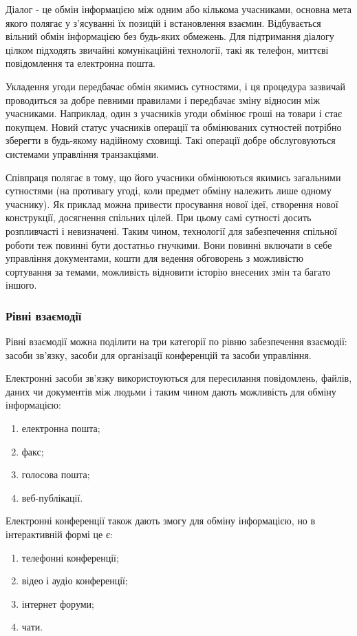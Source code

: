 \par Діалог - це обмін інформацією між одним або кількома учасниками, основна мета якого полягає у з'ясуванні їх позицій і встановлення взаємин. 
Відбувається вільний обмін інформацією без будь-яких обмежень. 
Для підтримання діалогу цілком підходять звичайні комунікаційні технології, такі як телефон, миттєві повідомлення та електронна пошта.
\par Укладення угоди передбачає обмін якимись сутностями, і ця процедура зазвичай проводиться за добре певними правилами і передбачає зміну відносин між учасниками. Наприклад, один з учасників угоди обмінює гроші на товари і стає покупцем. Новий статус учасників операції та обмінюваних сутностей потрібно зберегти в будь-якому надійному сховищі. Такі операції добре обслуговуються системами управління транзакціями. 
\par Співпраця полягає в тому, що його учасники обмінюються якимись загальними сутностями (на противагу угоді, коли предмет обміну належить лише одному учаснику). 
Як приклад можна привести просування нової ідеї, створення нової конструкції, досягнення спільних цілей. 
При цьому самі сутності досить розпливчасті і невизначені. 
Таким чином, технології для забезпечення спільної роботи теж повинні бути достатньо гнучкими. 
Вони повинні включати в себе управління документами, кошти для ведення обговорень з можливістю сортування за темами, можливість відновити історію внесених змін та багато іншого.
 
\subsubsection{Рівні взаємодії}

Рівні взаємодії можна поділити на три категорії по рівню забезпечення взаємодії: засоби зв'язку, засоби для організації конференцій та засоби управління.

\par Електронні засоби зв'язку використоуються для пересилання повідомлень, файлів, даних чи документів між людьми і таким чином дають можливість для обміну інформацією:
\begin{enumerate}
\item електронна пошта;
\item факс;
\item голосова пошта;
\item веб-публікації.
\end{enumerate}

Електронні конференції також дають змогу для обміну інформацією, но в інтерактивній формі це є:
\begin{enumerate}
\item телефонні конференції;
\item відео і аудіо конференції;
\item інтернет форуми;
\item чати.
\end{enumerate}

